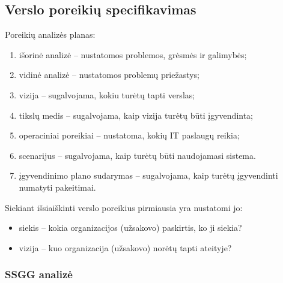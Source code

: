 \subsection{Verslo poreikių specifikavimas}

Poreikių analizės planas:
\begin{enumerate}
  \item išorinė analizė – nustatomos problemos, grėsmės ir galimybės;
  \item vidinė analizė – nustatomos problemų priežastys;
  \item vizija – sugalvojama, kokiu turėtų tapti verslas;
  \item tikslų medis – sugalvojama, kaip vizija turėtų būti įgyvendinta;
  \item operaciniai poreikiai – nustatoma, kokių IT paslaugų reikia;
  \item scenarijus – sugalvojama, kaip turėtų būti naudojamasi sistema.
  \item įgyvendinimo plano sudarymas – sugalvojama, kaip turėtų įgyvendinti
    numatyti pakeitimai.
\end{enumerate}

Siekiant išsiaiškinti verslo poreikius pirmiausia yra nustatomi jo:
\begin{itemize}
  \item siekis – kokia organizacijos (užsakovo) paskirtis, ko ji siekia?
  \item vizija – kuo organizacija (užsakovo) norėtų tapti ateityje?
\end{itemize}


\subsubsection{SSGG analizė}

